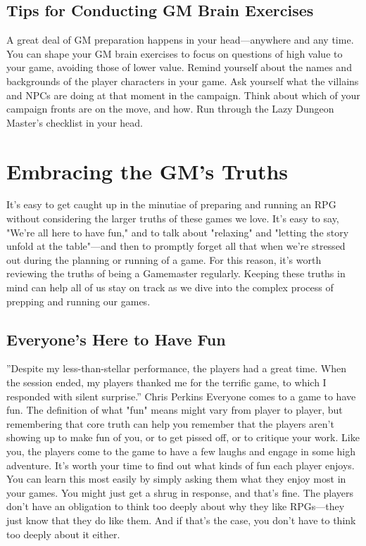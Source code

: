 \documentclass[10pt,a4paper,twoside,bg=print,twocolumn,openany,nodeprecatedcode]{dndbook}
\begin{document}
\subsection{Tips for Conducting GM Brain Exercises}
A great deal of GM preparation happens in your head—anywhere and any time.
You can shape your GM brain exercises to focus on questions of high value to your game, avoiding those of lower value.
Remind yourself about the names and backgrounds of the player characters in your game.
Ask yourself what the villains and NPCs are doing at that moment in the campaign.
Think about which of your campaign fronts are on the move, and how.
Run through the Lazy Dungeon Master's checklist in your head.
\section{Embracing the GM's Truths}
It's easy to get caught up in the minutiae of preparing and running an RPG without considering the larger truths of these games we love. It's easy to say, "We're all here to have fun," and to talk about "relaxing" and "letting the story unfold at the table"—and then to promptly forget all that when we're stressed out during the planning or running of a game.
For this reason, it's worth reviewing the truths of being a Gamemaster regularly. Keeping these truths in mind can help all of us stay on track as we dive into the complex process of prepping and running our games.
\subsection{Everyone's Here to Have Fun}
\DndQuote%
{}
{''Despite my less-than-stellar performance, the players had a great time. When the session ended, my players thanked me for the terrific game, to which I responded with silent surprise.''}
{Chris Perkins}
Everyone comes to a game to have fun. The definition of what "fun" means might vary from player to player, but remembering that core truth can help you remember that the players aren't showing up to make fun of you, or to get pissed off, or to critique your work. Like you, the players come to the game to have a few laughs and engage in some high adventure.
It's worth your time to find out what kinds of fun each player enjoys. You can learn this most easily by simply asking them what they enjoy most in your games. You might just get a shrug in response, and that's fine. The players don't have an obligation to think too deeply about why they like RPGs—they just know that they do like them. And if that's the case, you don't have to think too deeply about it either.
\end{document}
